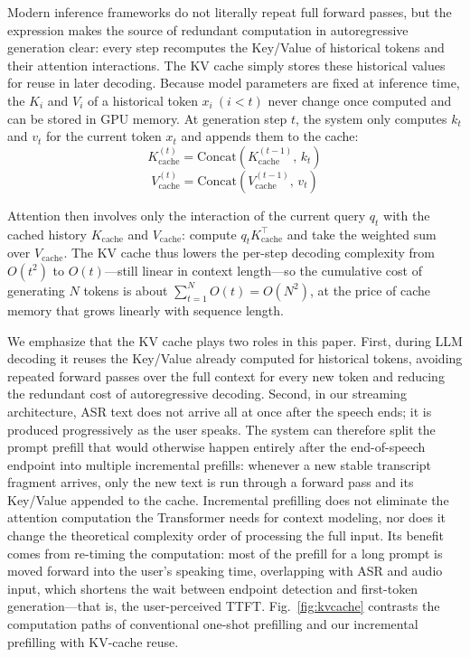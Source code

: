 \documentclass[conference]{IEEEtran}
\begin{document}
Modern inference frameworks do not literally repeat full forward passes, but the expression makes the source of redundant computation in autoregressive generation clear: every step recomputes the Key/Value of historical tokens and their attention interactions. The KV cache simply stores these historical values for reuse in later decoding. Because model parameters are fixed at inference time, the $K_i$ and $V_i$ of a historical token $x_i\ (i<t)$ never change once computed and can be stored in GPU memory. At generation step $t$, the system only computes $k_t$ and $v_t$ for the current token $x_t$ and appends them to the cache:
\begin{equation}
K_{\mathrm{cache}}^{(t)}=\mathrm{Concat}\left(K_{\mathrm{cache}}^{(t-1)},\,k_t\right)
\label{eq:kcache}
\end{equation}
\begin{equation}
V_{\mathrm{cache}}^{(t)}=\mathrm{Concat}\left(V_{\mathrm{cache}}^{(t-1)},\,v_t\right)
\label{eq:vcache}
\end{equation}

Attention then involves only the interaction of the current query $q_t$ with the cached history $K_{\mathrm{cache}}$ and $V_{\mathrm{cache}}$: compute $q_t K_{\mathrm{cache}}^{\top}$ and take the weighted sum over $V_{\mathrm{cache}}$. The KV cache thus lowers the per-step decoding complexity from $O(t^{2})$ to $O(t)$---still linear in context length---so the cumulative cost of generating $N$ tokens is about $\sum_{t=1}^{N}O(t)=O(N^{2})$, at the price of cache memory that grows linearly with sequence length.

We emphasize that the KV cache plays two roles in this paper. First, during LLM decoding it reuses the Key/Value already computed for historical tokens, avoiding repeated forward passes over the full context for every new token and reducing the redundant cost of autoregressive decoding. Second, in our streaming architecture, ASR text does not arrive all at once after the speech ends; it is produced progressively as the user speaks. The system can therefore split the prompt prefill that would otherwise happen entirely after the end-of-speech endpoint into multiple incremental prefills: whenever a new stable transcript fragment arrives, only the new text is run through a forward pass and its Key/Value appended to the cache. Incremental prefilling does not eliminate the attention computation the Transformer needs for context modeling, nor does it change the theoretical complexity order of processing the full input. Its benefit comes from re-timing the computation: most of the prefill for a long prompt is moved forward into the user's speaking time, overlapping with ASR and audio input, which shortens the wait between endpoint detection and first-token generation---that is, the user-perceived TTFT. Fig.~\ref{fig:kvcache} contrasts the computation paths of conventional one-shot prefilling and our incremental prefilling with KV-cache reuse.
\end{document}
